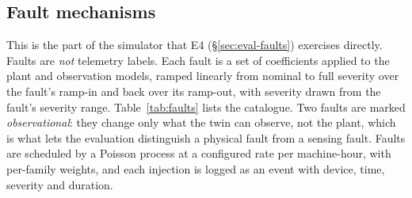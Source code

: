 \documentclass[preprint,12pt,authoryear,nopreprintline]{elsarticle}
\begin{document}
\subsection{Fault mechanisms}
\label{sec:faults}
This is the part of the simulator that E4 (\S\ref{sec:eval-faults}) exercises
directly.
Faults are \emph{not} telemetry labels. Each fault is a set of coefficients
applied to the plant and observation models, ramped linearly from nominal to full
severity over the fault's ramp-in and back over its ramp-out, with severity drawn
from the fault's severity range.
Table~\ref{tab:faults} lists the catalogue.
Two faults are marked \emph{observational}: they change only what the twin can
observe, not the plant, which is what lets the evaluation distinguish a physical
fault from a sensing fault.
Faults are scheduled by a Poisson process at a configured rate per machine-hour,
with per-family weights, and each injection is logged as an event with device,
time, severity and duration.
\end{document}
